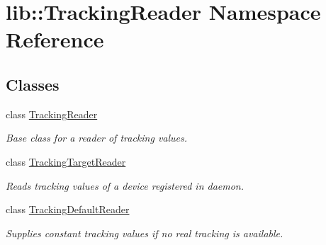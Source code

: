 \hypertarget{namespacelib_1_1TrackingReader}{\section{lib\-:\-:\-Tracking\-Reader \-Namespace \-Reference}
\label{namespacelib_1_1TrackingReader}
}
\subsection*{\-Classes}
\begin{DoxyCompactItemize}
\item 
class \hyperlink{classlib_1_1TrackingReader_1_1TrackingReader}{\-Tracking\-Reader}
\begin{DoxyCompactList}\small\item\em \-Base class for a reader of tracking values. \end{DoxyCompactList}\item 
class \hyperlink{classlib_1_1TrackingReader_1_1TrackingTargetReader}{\-Tracking\-Target\-Reader}
\begin{DoxyCompactList}\small\item\em \-Reads tracking values of a device registered in daemon. \end{DoxyCompactList}\item 
class \hyperlink{classlib_1_1TrackingReader_1_1TrackingDefaultReader}{\-Tracking\-Default\-Reader}
\begin{DoxyCompactList}\small\item\em \-Supplies constant tracking values if no real tracking is available. \end{DoxyCompactList}\end{DoxyCompactItemize}
